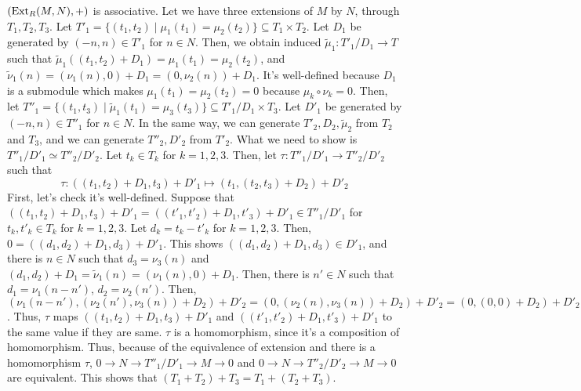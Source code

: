 \((\textnormal{Ext}_R(M, N), +)\) is associative.
Let we have three extensions of \(M\) by \(N\), through \(T_1, T_2, T_3\).
Let \(T'_1 = \{(t_1, t_2) \mid \mu_1(t_1) = \mu_2(t_2)\} \subseteq T_1 \times T_2\).
Let \(D_1\) be generated by \((-n, n) \in T'_1\) for \(n \in N\).
Then, we obtain induced \(\tilde\mu_1: T'_1/D_1 \to T\)
such that \(\tilde\mu_1((t_1, t_2) + D_1) = \mu_1(t_1) = \mu_2(t_2)\),
and \(\tilde\nu_1(n) = (\nu_1(n), 0) + D_1 = (0, \nu_2(n)) + D_1\).
It's well-defined because \(D_1\) is a submodule which makes \(\mu_1(t_1) = \mu_2(t_2) = 0\) because \(\mu_k \circ \nu_k = 0\).
Then, let \(T''_1 = \{(t_1, t_3) \mid \tilde\mu_1(t_1) = \mu_3(t_3)\} \subseteq T'_1 / D_1 \times T_3\).
Let \(D'_1\) be generated by \((-n, n) \in T''_1\) for \(n \in N\).
In the same way, we can generate \(T'_2, D_2, \tilde\mu_2\) from \(T_2\) and \(T_3\),
and we can generate \(T''_2, D'_2\) from \(T'_2\).
What we need to show is \(T''_1 / D'_1 \simeq T''_2 / D'_2\).
Let \(t_k \in T_k\) for \(k = 1, 2, 3\).
Then, let \(\tau: T''_1 / D'_1 \to T''_2 / D'_2\) such that
\[\tau: ((t_1, t_2) + D_1, t_3) + D'_1 \mapsto (t_1, (t_2, t_3) + D_2) + D'_2\]
First, let's check it's well-defined.
Suppose that \(((t_1, t_2) + D_1, t_3) + D'_1 = ((t'_1, t'_2) + D_1, t'_3) + D'_1 \in T''_1 / D'_1\)
for \(t_k, t'_k \in T_k\) for \(k = 1, 2, 3\).
Let \(d_k = t_k - t'_k\) for \(k = 1, 2, 3\).
Then, \(0 = ((d_1, d_2) + D_1, d_3) + D'_1\).
This shows \(((d_1, d_2) + D_1, d_3) \in D'_1\), and there is \(n \in N\) such that
\(d_3 = \nu_3(n)\) and
\((d_1, d_2) + D_1 = \tilde\nu_1(n) = (\nu_1(n), 0) + D_1\).
Then, there is \(n' \in N\) such that
\(d_1 = \nu_1(n - n')\),
\(d_2 = \nu_2(n')\).
Then, \((\nu_1(n-n'), (\nu_2(n'), \nu_3(n)) + D_2) + D'_2 =
(0, (\nu_2(n), \nu_3(n)) + D_2) + D'_2
= (0, (0, 0) + D_2) + D'_2\).
Thus, \(\tau\) maps \(((t_1, t_2) + D_1, t_3) + D'_1\) and \(((t'_1, t'_2) + D_1, t'_3) + D'_1\) to the same value if they are same.
\(\tau\) is a homomorphism, since it's a composition of homomorphism.
Thus, because of the equivalence of extension and there is a homomorphism \(\tau\),
\(0 \to N \to T''_1 / D'_1 \to M \to 0\) and \(0 \to N \to T''_2 / D'_2 \to M \to 0\)
are equivalent.
This shows that \((T_1 + T_2) + T_3 = T_1 + (T_2 + T_3)\).

